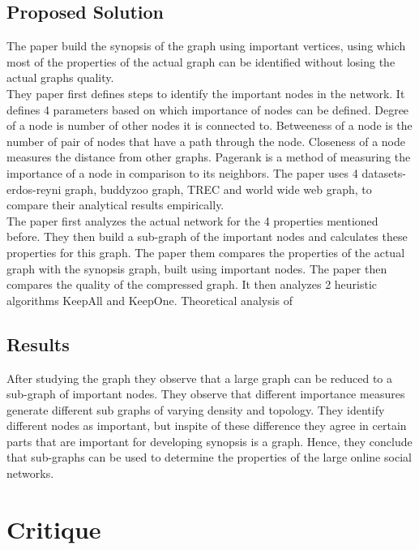 \documentclass[12pt, onecolumn]{IEEEtran}
\begin{document}
\subsection{Proposed Solution}
The paper build the synopsis of the graph using important vertices, using which
most of the properties of the actual graph can be identified without losing the
actual graphs quality. 
\\
They  paper first defines steps to identify the important nodes
in the network. It defines 4 parameters based on which importance of nodes can
be defined. Degree of a node is number of other nodes it is connected to.
Betweeness of a node is the number of pair of nodes that have a path through the
node. Closeness of a node measures the distance from other graphs. Pagerank is
a method of measuring the importance of a node in comparison to its neighbors.
The paper uses 4 datasets- erdos-reyni graph, buddyzoo graph, TREC and world
wide web graph, to compare their analytical results empirically.
\\
The paper first analyzes the actual network for the 4 properties mentioned
before. They then build a sub-graph of the important nodes and calculates
these properties for this graph. The paper them compares the properties of the
actual graph with the synopsis graph, built using important nodes. The paper then compares the quality of the compressed graph. It then analyzes 2
heuristic algorithms KeepAll and KeepOne. Theoretical analysis of 
\\
\subsection{Results}
After studying the graph they observe that a large graph can be reduced to a
sub-graph of important nodes. They observe that different importance measures
generate different sub graphs of varying density and topology. They identify
different nodes as important, but inspite of these difference they agree in
certain parts that are important for developing synopsis is a graph. Hence,
they conclude that sub-graphs can be used to determine the properties of the
large online social networks.
\\
\section{Critique}
\end{document}
